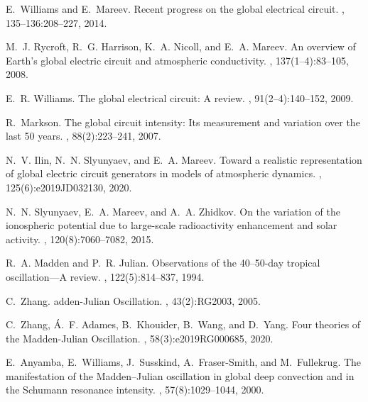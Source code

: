 \documentclass[12pt, russian, a4paper]{article}
\begin{document}
    \newpage
    
    \begin{thebibliography}{10}

E.~Williams and E.~Mareev.
\newblock Recent progress on the global electrical circuit.
, 135--136:208--227, 2014.

M.~J. Rycroft, R.~G. Harrison, K.~A. Nicoll, and E.~A. Mareev.
\newblock An overview of {E}arth’s global electric circuit and atmospheric
  conductivity.
, 137(1--4):83--105, 2008.

E.~R. Williams.
\newblock The global electrical circuit: A review.
, 91(2--4):140--152, 2009.

R.~Markson.
\newblock The global circuit intensity: Its measurement and variation over the
  last 50 years.
, 88(2):223--241, 2007.

N.~V. Ilin, N.~N. Slyunyaev, and E.~A. Mareev.
\newblock Toward a realistic representation of global electric circuit
  generators in models of atmospheric dynamics.
, 125(6):e2019JD032130, 2020.

N.~N. Slyunyaev, E.~A. Mareev, and A.~A. Zhidkov.
\newblock On the variation of the ionospheric potential due to large-scale
  radioactivity enhancement and solar activity.
,
  120(8):7060--7082, 2015.

R.~A. Madden and P.~R. Julian.
\newblock Observations of the 40–50-day tropical oscillation—{A} review.
, 122(5):814--837, 1994.

C.~Zhang.
adden-{J}ulian {O}scillation.
, 43(2):RG2003, 2005.

C.~Zhang, {\'A}.~F. Adames, B.~Khouider, B.~Wang, and D.~Yang.
\newblock Four theories of the {M}adden-{J}ulian {O}scillation.
, 58(3):e2019RG000685, 2020.

E.~Anyamba, E.~Williams, J.~Susskind, A.~Fraser-Smith, and M.~Fullekrug.
\newblock The manifestation of the {M}adden–{J}ulian oscillation in global
  deep convection and in the {S}chumann resonance intensity.
, 57(8):1029--1044, 2000.


\end{thebibliography}
\end{document}
